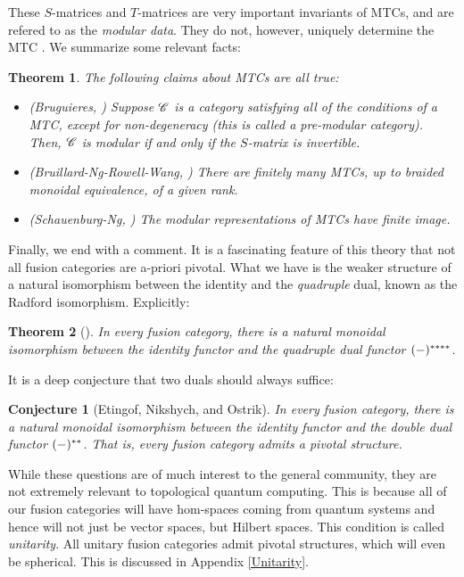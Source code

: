 \documentclass{article}
\newtheorem{theorem}{Theorem}[section]
\newtheorem{conjecture}{Conjecture}[section]
\theoremstyle{definition}
\numberwithin{figure}{section}
\begin{document}
These $S$-matrices and $T$-matrices are very important invariants of MTCs, and are refered to as the \textit{modular data}. They do not, however, uniquely determine the MTC \cite{mignard2021modular}. We summarize some relevant facts:

\begin{theorem} The following claims about MTCs are all true:

\begin{itemize}
\item (Bruguieres, \cite{bruguieres2000categories}) Suppose $\mathscr{C}$ is a category satisfying all of the conditions of a MTC, except for non-degeneracy (this is called a pre-modular category). Then, $\mathscr{C}$ is modular if and only if the $S$-matrix is invertible.
\item (Bruillard-Ng-Rowell-Wang, \cite{bruillard2016rank}) There are finitely many MTCs, up to braided monoidal equivalence, of a given rank.
\item (Schauenburg-Ng, \cite{ng2010congruence}) The modular representations of MTCs have finite image.
\end{itemize}
\end{theorem}

Finally, we end with a comment. It is a fascinating feature of this theory that not all fusion categories are a-priori pivotal. What we have is the weaker structure of a natural isomorphism between the identity and the \textit{quadruple} dual, known as the Radford isomorphism. Explicitly:

\begin{theorem}[\cite{etingof2005fusion}] In every fusion category, there is a natural monoidal isomorphism between the identity functor and the quadruple dual functor $(\--)^{****}$.
\end{theorem}

It is a deep conjecture that two duals should always suffice:

\begin{conjecture}[Etingof, Nikshych, and Ostrik] In every fusion category, there is a natural monoidal isomorphism between the identity functor and the double dual functor $(\--)^{**}$. That is, every fusion category admits a pivotal structure.
\end{conjecture}

While these questions are of much interest to the general community, they are not extremely relevant to topological quantum computing. This is because all of our fusion categories will have hom-spaces coming from quantum systems and hence will not just be vector spaces, but Hilbert spaces. This condition is called \textit{unitarity}. All unitary fusion categories admit pivotal structures, which will even be spherical. This is discussed in Appendix \ref{Unitarity}.
\end{document}
